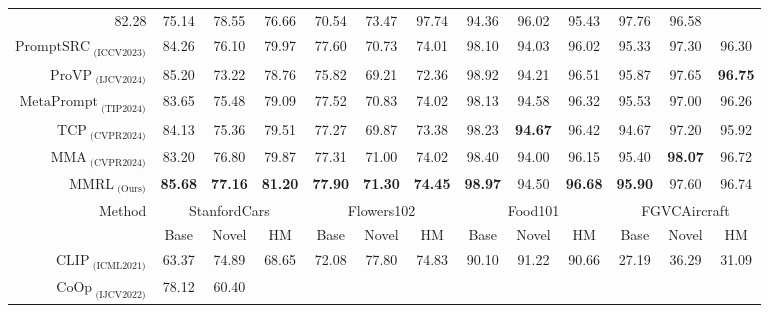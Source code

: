\begin{table}[t]
{{\begin{tabular}{@{}r|ccc|ccc|ccc|ccc@{}}
      82.28 &
      75.14 &
      78.55 &
      76.66 &
      70.54 &
      73.47 &
      97.74 &
      94.36 &
      96.02 &
      95.43 &
      97.76 &
      96.58 \\
    $\text{PromptSRC}_{\text{ (ICCV2023)}}$ &
      84.26 &
      76.10 &
      79.97 &
      77.60 &
      70.73 &
      74.01 &
      98.10 &
      94.03 &
      96.02 &
      95.33 &
      97.30 &
      96.30 \\
    $\text{ProVP}_{\text{ (IJCV2024)}}$ &
      85.20 &
      73.22 &
      78.76 &
      75.82 &
      69.21 &
      72.36 &
      98.92 &
      94.21 &
      96.51 &
      95.87 &
      97.65 &
      \textbf{96.75} \\
    $\text{MetaPrompt}_{\text{ (TIP2024)}}$ &
      83.65 &
      75.48 &
      79.09 &
      77.52 &
      70.83 &
      74.02 &
      98.13 &
      94.58 &
      96.32 &
      95.53 &
      97.00 &
      96.26 \\
    $\text{TCP}_{\text{ (CVPR2024)}}$ &
      84.13 &
      75.36 &
      79.51 &
      77.27 &
      69.87 &
      73.38 &
      98.23 &
      \textbf{94.67} &
      96.42 &
      94.67 &
      97.20 &
      95.92 \\
    $\text{MMA}_{\text{ (CVPR2024)}}$ &
      83.20 &
      76.80 &
      79.87 &
      77.31 &
      71.00 &
      74.02 &
      98.40 &
      94.00 &
      96.15 &
      95.40 &
      \textbf{98.07} &
      96.72 \\ \midrule
    $\text{MMRL}_{\text{ (Ours)}}$ &
      \textbf{85.68} &
      \textbf{77.16} &
      \textbf{81.20} &
      \textbf{77.90} &
      \textbf{71.30} &
      \textbf{74.45} &
      \textbf{98.97} &
      94.50 &
      \textbf{96.68} &
      \textbf{95.90} &
      97.60 &
      96.74 \\ \midrule \midrule
    \multirow{2}{*}{Method} &
      \multicolumn{3}{c|}{StanfordCars} &
      \multicolumn{3}{c|}{Flowers102} &
      \multicolumn{3}{c|}{Food101} &
      \multicolumn{3}{c}{FGVCAircraft} \\
     &
      Base &
      Novel &
      HM &
      Base &
      Novel &
      HM &
      Base &
      Novel &
      HM &
      Base &
      Novel &
      HM \\ \midrule
    $\text{CLIP}_{\text{ (ICML2021)}}$ &
      63.37 &
      74.89 &
      68.65 &
      72.08 &
      77.80 &
      74.83 &
      90.10 &
      91.22 &
      90.66 &
      27.19 &
      36.29 &
      31.09 \\
    $\text{CoOp}_{\text{ (IJCV2022)}}$ &
      78.12 &
      60.40 &

\end{tabular}}}
\end{table}
